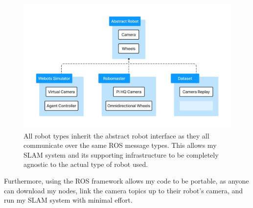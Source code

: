 \begin{figure}[h]
    \centering
    \includegraphics[trim=5cm 5cm 5cm 5cm, scale=0.15]{figures/abstract_camera_interface.pdf}

    \caption{All robot types inherit the abstract robot interface as they all communicate over the same ROS message types. This allows my SLAM system and its supporting infrastructure to be completely agnostic to the actual type of robot used.}
    \label{fig:abstract-camera-interface}
\end{figure}

Furthermore, using the ROS framework allows my code to be portable, as anyone can download my nodes, link the camera topics up to their robot's camera, and run my SLAM system with minimal effort.



